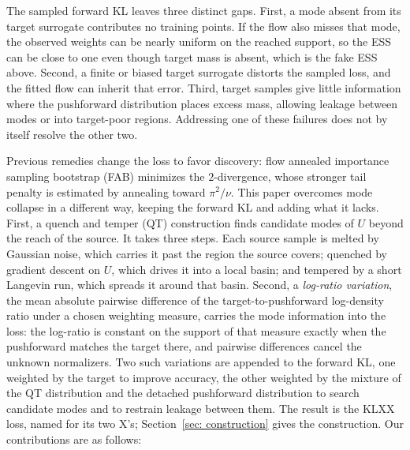 \documentclass{article}
\begin{document}
The sampled forward KL leaves three distinct gaps. First, a mode absent from its target surrogate contributes no training points. If the flow also misses that mode, the observed weights can be nearly uniform on the reached support, so the ESS can be close to one even though target mass is absent, which is the fake ESS above. Second, a finite or biased target surrogate distorts the sampled loss, and the fitted flow can inherit that error. Third, target samples give little information where the pushforward distribution places excess mass, allowing leakage between modes or into target-poor regions. Addressing one of these failures does not by itself resolve the other two.

Previous remedies change the loss to favor discovery: flow annealed importance sampling bootstrap (FAB) \citep{midgley2022flow} minimizes the $2$-divergence, whose stronger tail penalty is estimated by annealing toward $\pi^2/\nu$. This paper overcomes mode collapse in a different way, keeping the forward KL and adding what it lacks. First, a quench and temper (QT) construction finds candidate modes of $U$ beyond the reach of the source. It takes three steps. Each source sample is melted by Gaussian noise, which carries it past the region the source covers; quenched by gradient descent on $U$, which drives it into a local basin; and tempered by a short Langevin run, which spreads it around that basin. Second, a \emph{log-ratio variation}, the mean absolute pairwise difference of the target-to-pushforward log-density ratio under a chosen weighting measure, carries the mode information into the loss: the log-ratio is constant on the support of that measure exactly when the pushforward matches the target there, and pairwise differences cancel the unknown normalizers. Two such variations are appended to the forward KL, one weighted by the target to improve accuracy, the other weighted by the mixture of the QT distribution and the detached pushforward distribution to search candidate modes and to restrain leakage between them. The result is the KLXX loss, named for its two X's; Section~\ref{sec: construction} gives the construction. Our contributions are as follows:
\end{document}
